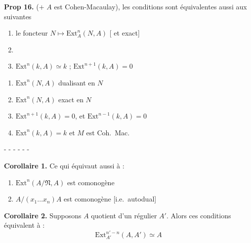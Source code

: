\documentclass[11pt,a4paper]{article}
\begin{document}
\textbf{Prop 16.} ($+$ $A$ est Cohen-Macaulay), les
conditions  sont
équivalentes aussi aux suivantes
\begin{enumerate}
  \item[a')] \struck{\ill{}} le foncteur $N \mapsto \mathrm{Ext}^n_A(N, A)$
      \struck{\ill{}}
    [\ill{} \ill{} et exact]
  \item[c')] \ill{}
  \item[\ill{}] $\mathrm{Ext}^n(k, A) \simeq k$ ;
    $\mathrm{Ext}^{n+1}(k, A) = 0$
\end{enumerate}

\begin{enumerate}
  \item[b')] $\mathrm{Ext}^n(N, A)$ dualisant en $N$
  \item[c')] $\mathrm{Ext}^n(N, A)$ exact en $N$
  \item[c'')] $\mathrm{Ext}^{n+1}(k, A) = 0$, et
    $\mathrm{Ext}^{n-1}(k, A) = 0$
  \item[d)] $\mathrm{Ext}^n(k, A) = k$ et 
    $M$ est Coh.\ Mac.
\end{enumerate}



- - - - - -

\textbf{Corollaire 1.} Ce qui équivaut aussi à :
\begin{enumerate}
  \item[e')] $\mathrm{Ext}^n(A/\mathfrak{N}, A)$ est comonogène
  \item[e'')] $A/(x_1 \ldots x_n)A$ est comonogène [i.e.\
    autodual]
\end{enumerate}

\textbf{Corollaire 2.} Supposons $A$ quotient d'un régulier $A'$. Alors
ces conditions équivalent à :
\[
  \mathrm{Ext}^{n'-n}_{A'}(A, A') \simeq A
\]
\end{document}
